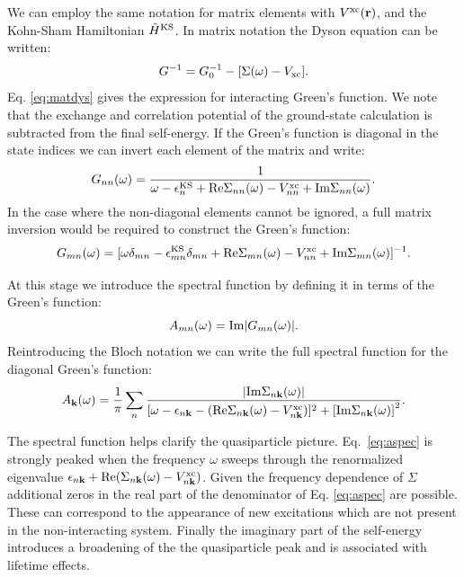 We can employ the same notation for matrix elements with $V^{\rm{xc}}({\bf r})$,
and the Kohn-Sham Hamiltonian $\hat{H}^{\rm{KS}}$.
%
In matrix notation the Dyson equation \cite{inkson86} can be written:
%
\begin{equation}
\label{eq:matdys}
G^{-1} = G_{0}^{-1} - [\Sigma(\omega) - V_{\rm{xc}}].
\end{equation}
%
Eq. \ref{eq:matdys} gives the expression for interacting Green's function.
We note that the exchange and correlation potential of the ground-state
calculation is subtracted from the final self-energy. If the Green's function is diagonal
in the state indices we can invert each element of the matrix and write:
%
\begin{equation}
G_{nn}(\omega) = \frac{1}{\omega -\epsilon^{\rm{KS}}_{n}+{\rm Re}\Sigma_{nn}(\omega)-V^{\rm{xc}}_{nn}+{\rm Im}\Sigma_{nn}(\omega)}.
\end{equation}
%
In the case where the non-diagonal elements cannot be ignored,
a full matrix inversion would be required to construct the Green's function:
%
\begin{equation}
G_{mn}(\omega) = [\omega \delta_{mn} - \epsilon^{\rm{KS}}_{mn}\delta_{mn} + {\rm Re}\Sigma_{mn}(\omega) - V^{\rm{xc}}_{nn} + {\rm Im}\Sigma_{mn}(\omega)]^{-1}.
\end{equation}

At this stage we introduce the spectral function by defining it in terms of the Green's function:
%
\begin{equation}
A_{mn}(\omega) = {\rm Im} |G_{mn}(\omega)|.
\end{equation}
%
Reintroducing the Bloch notation we can write the full spectral function
for the diagonal Green's function:
%
\begin{equation}
\label{eq:aspec}
A_{\bf k}(\omega) = \frac{1}{\pi}\sum_{n} \frac{|{\rm Im}\Sigma_{n{\bf k}}(\omega)|}
{[\omega- \epsilon_{n{\bf k}}-({\rm Re}\Sigma_{n{\bf k}}(\omega) -V^{\rm{xc}}_{n{\bf k}})]^{2} + \left[{\rm Im}\Sigma_{n{\bf k}}(\omega)\right]^{2}}.
\end{equation}

The spectral function helps clarify the quasiparticle picture. Eq.~\ref{eq:aspec} is strongly
peaked when the frequency $\omega$ sweeps through the renormalized
eigenvalue $\epsilon_{n{\bf k}} + {\rm Re}(\Sigma_{n{\bf k}}(\omega) - V^{\rm{xc}}_{n{\bf k}}) $. Given
the frequency dependence of $\Sigma$ additional zeros in the real part of the
denominator of Eq. \ref{eq:aspec} are possible. These can correspond to the
appearance of new excitations which are not present in the non-interacting system. Finally
the imaginary part of the self-energy introduces a broadening of the the quasiparticle peak
and is associated with lifetime effects.

